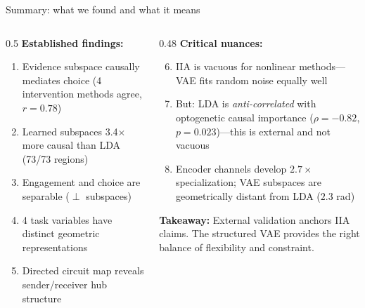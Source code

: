 \documentclass[aspectratio=169,11pt]{beamer}
\begin{document}
\begin{frame}{Summary: what we found and what it means}
\begin{columns}[T]
\begin{column}{0.5\textwidth}
\textbf{Established findings:}
\begin{enumerate}
  \item Evidence subspace causally mediates choice (4 intervention methods agree, $r = 0.78$)
  \item Learned subspaces 3.4$\times$ more causal than LDA (73/73 regions)
  \item Engagement and choice are separable ($\perp$ subspaces)
  \item 4 task variables have distinct geometric representations
  \item Directed circuit map reveals sender/receiver hub structure
\end{enumerate}
\end{column}
\begin{column}{0.48\textwidth}
\textbf{Critical nuances:}
\begin{enumerate}
  \setcounter{enumi}{5}
  \item \textcolor{fail}{IIA is vacuous for nonlinear methods}---VAE fits random noise equally well
  \item \textcolor{pass}{But:} LDA is \emph{anti-correlated} with optogenetic causal importance ($\rho = -0.82$, $p = 0.023$)---this is external and not vacuous
  \item Encoder channels develop $2.7\times$ specialization; VAE subspaces are geometrically distant from LDA ($2.3$ rad)
\end{enumerate}

\vspace{0.3em}
{\small \textbf{Takeaway:} External validation anchors IIA claims. The structured VAE provides the right balance of flexibility and constraint.}
\end{column}
\end{columns}
\end{frame}
\end{document}
